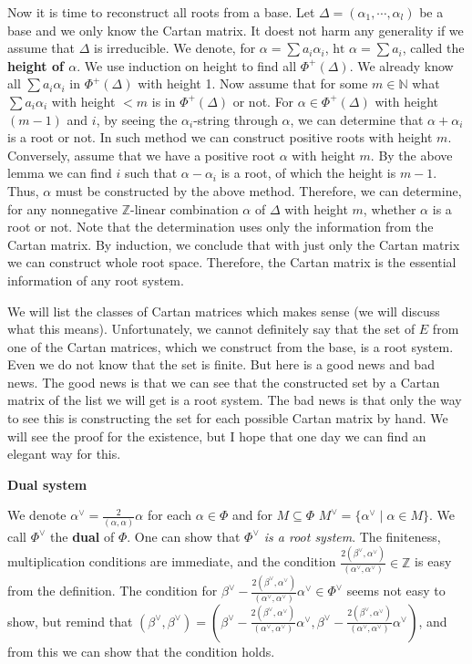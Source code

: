 \documentclass{article}
\newcommand{\NaN}{\mathbb{N}}
\newcommand{\InZ}{\mathbb{Z}}
\newcommand{\SBar}{\;|\;}
\begin{document}
Now it is time to reconstruct all roots from a base.
Let $\Delta = (\alpha_1, \cdots, \alpha_l)$ be a base and we only know the Cartan matrix.
It doest not harm any generality if we assume that $\Delta$ is irreducible.
We denote, for $\alpha = \sum a_i \alpha_i$, $\textrm{ht }\alpha = \sum a_i$, called the \textbf{height of $\alpha$}.
We use induction on height to find all $\Phi^+(\Delta)$.
We already know all $\sum a_i \alpha_i$ in $\Phi^+(\Delta)$ with height 1.
Now assume that for some $m \in \NaN$ what $\sum a_i \alpha_i$ with height $< m$ is in $\Phi^+(\Delta)$ or not.
For $\alpha \in \Phi^+(\Delta)$ with height $(m - 1)$ and $i$, by seeing the $\alpha_i$-string through $\alpha$, we can determine that $\alpha + \alpha_i$ is a root or not.
In such method we can construct positive roots with height $m$.
Conversely, assume that we have a positive root $\alpha$ with height $m$.
By the above lemma we can find $i$ such that $\alpha - \alpha_i$ is a root, of which the height is $m - 1$.
Thus, $\alpha$ must be constructed by the above method.
Therefore, we can determine, for any nonnegative $\InZ$-linear combination $\alpha$ of $\Delta$ with height $m$, whether $\alpha$ is a root or not.
Note that the determination uses only the information from the Cartan matrix.
By induction, we conclude that with just only the Cartan matrix we can construct whole root space.
Therefore, the Cartan matrix is the essential information of any root system.

We will list the classes of Cartan matrices which makes sense (we will discuss what this means).
Unfortunately, we cannot definitely say that the set of $E$ from one of the Cartan matrices, which we construct from the base, is a root system.
Even we do not know that the set is finite.
But here is a good news and bad news.
The good news is that we can see that the constructed set by a Cartan matrix of the list we will get is a root system.
The bad news is that only the way to see this is constructing the set for each possible Cartan matrix by hand.
We will see the proof for the existence, but I hope that one day we can find an elegant way for this.

\newpage

\textbf{Dual system}

We denote $\alpha^\vee = \frac{2}{(\alpha, \alpha)} \alpha$ for each $\alpha \in \Phi$ and for $M \subseteq \Phi$ $M^\vee = \{ \alpha^\vee \SBar \alpha \in M \}$.
We call $\Phi^\vee$ the \textbf{dual} of $\Phi$.
One can show that \textit{$\Phi^\vee$ is a root system}.
The finiteness, multiplication conditions are immediate, and the condition $\frac{2(\beta^\vee, \alpha^\vee)}{(\alpha^\vee, \alpha^\vee)} \in \InZ$ is easy from the definition.
The condition for $\beta^\vee - \frac{2(\beta^\vee, \alpha^\vee)}{(\alpha^\vee, \alpha^\vee)} \alpha^\vee \in \Phi^\vee$ seems not easy to show, but remind that $(\beta^\vee, \beta^\vee) = (\beta^\vee - \frac{2(\beta^\vee, \alpha^\vee)}{(\alpha^\vee, \alpha^\vee)} \alpha^\vee, \beta^\vee - \frac{2(\beta^\vee, \alpha^\vee)}{(\alpha^\vee, \alpha^\vee)} \alpha^\vee)$, and from this we can show that the condition holds.
\end{document}
